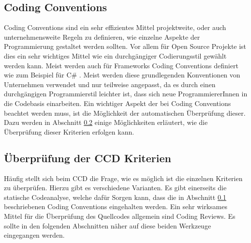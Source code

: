 \subsection{Coding Conventions}
\label{cha:CodingConventions}
Coding Conventions sind ein sehr effizientes Mittel projektweite, oder auch unternehmensweite Regeln zu definieren, wie einzelne Aspekte der Programmierung gestaltet werden sollten. Vor allem für Open Source Projekte ist dies ein sehr wichtiges Mittel wie ein durchgängiger Codierungsstil gewählt werden kann. Meist werden auch für Frameworks Coding Conventions definiert wie zum Beispiel für C\# \cite{Microsoft2016}. Meist werden diese grundlegenden Konventionen von Unternehmen verwendet und nur teilweise angepasst, da es durch einen durchgängigen Programmierstil leichter ist, dass sich neue ProgrammiererInnen in die Codebasis einarbeiten. Ein wichtiger Aspekt der bei Coding Conventions beachtet werden muss, ist die Möglichkeit der automatischen Überprüfung dieser. Dazu werden in Abschnitt \ref{cha:CheckingCCDCriterias} einige Möglichkeiten erläutert, wie die Überprüfung dieser Kriterien erfolgen kann.

 
\subsection{Überprüfung der CCD Kriterien}
\label{cha:CheckingCCDCriterias}
Häufig stellt sich beim CCD die Frage, wie es möglich ist die einzelnen Kriterien zu überprüfen. Hierzu gibt es verschiedene Varianten. Es gibt einerseits die statische Codeanalyse, welche dafür Sorgen kann, dass die in Abschnitt \ref{cha:CodingConventions} beschriebenen Coding Conventions eingehalten werden. Ein sehr wirksames Mittel für die Überprüfung des Quellcodes allgemein sind Coding Reviews. Es sollte in den folgenden Abschnitten näher auf diese beiden Werkzeuge eingegangen werden.


